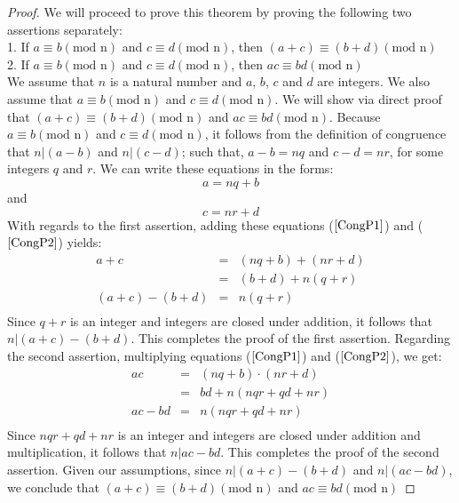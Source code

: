 \documentclass{book}
\theoremstyle{definition}
\theoremstyle{remark}
\newcommand{\m}{\cdot}
\begin{document}
\begin{proof}


We will proceed to prove this theorem by proving the following two assertions separately: \\
1. If $a \equiv b (\text{mod n})$ and $c \equiv d (\text{mod n})$, then $(a + c) \equiv (b + d) (\text{mod n})$\\
2. If $a \equiv b (\text{mod n})$ and $c \equiv d (\text{mod n})$, then $ac \equiv bd (\text{mod n})$ \\
We assume that $n$ is a natural number and $a$, $b$, $c$ and $d$ are integers. We also assume that $a \equiv b (\text{mod n})$ and $c \equiv d (\text{mod n})$. We will show via direct proof that $(a + c) \equiv (b + d) (\text{mod n})$ and $ac \equiv bd (\text{mod n})$. Because $a \equiv b (\text{mod n})$ and $c \equiv d (\text{mod n})$, it follows from the definition of congruence that $n|(a-b)$ and $n|(c-d)$; such that, $a-b = nq$ and $c-d = nr$, for some integers $q$ and $r$. We can write these equations in the forms:
	\begin{equation}
	\label{CongP1}
		a = nq + b
	\end{equation}
and 
	\begin{equation}
	\label{CongP2}
		c = nr + d	
	\end{equation}
With regards to the first assertion, adding these equations ($\ref{CongP1}$) and ($\ref{CongP2}$) yields: 
	\begin{eqnarray}
		a + c & = & (nq + b) + (nr + d) \nonumber \\
		& = & (b+d) + n(q + r) \nonumber \\
		(a + c) - (b + d) & = & n(q + r) \nonumber \\
	\end{eqnarray}	 
Since $q + r$ is an integer and integers are closed under addition, it follows that $n | (a + c) - (b + d)$. This completes the proof of the first assertion. 
Regarding the second assertion, multiplying equations ($\ref{CongP1}$) and ($\ref{CongP2}$), we get: 
	\begin{eqnarray}
		ac & = & (nq + b) \m (nr + d) \nonumber \\
		& = & bd + n(nqr + qd + nr) \nonumber \\
		ac - bd & = & n(nqr + qd + nr) \nonumber \\
	\end{eqnarray}	 
Since $nqr + qd + nr$ is an integer and integers are closed under addition and multiplication, it follows that $n | ac - bd$. This completes the proof of the second assertion. Given our assumptions, since $n | (a + c) - (b + d)$ and $n | (ac - bd)$, we conclude that $(a + c) \equiv (b + d) (\text{mod n})$ and $ac \equiv bd (\text{mod n})$

\end{proof}
\end{document}
